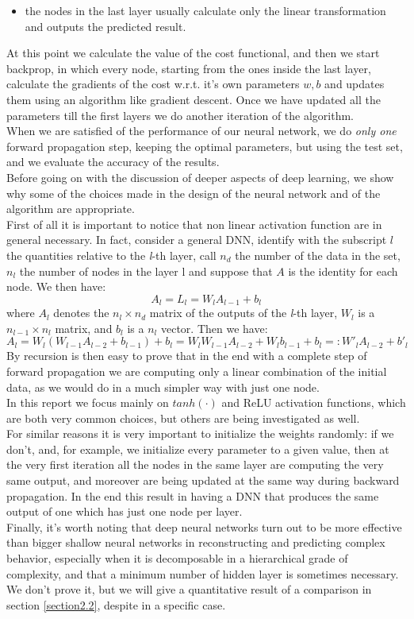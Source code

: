 \documentclass[12pt, a4paper]{report}
\theoremstyle{definition}
\begin{document}
{\begin{itemize}
\item the nodes in the last layer usually calculate only the linear transformation and outputs the predicted result.
\end{itemize}
At this point we calculate the value of the cost functional, and then we start backprop, in which every node, starting from the ones inside the last layer, calculate the gradients of the cost w.r.t. it's own parameters $w,b$ and updates them using an algorithm like gradient descent. Once we have updated all the parameters till the first layers we do another iteration of the algorithm.\\
When we are satisfied of the performance of our neural network, we do \textit{only one} forward propagation step, keeping the optimal parameters, but using the test set, and we evaluate the accuracy of the results.\\
\newline
\noindent Before going on with the discussion of deeper aspects of deep learning, we show why some of the choices made in the design of the neural network and of the algorithm are appropriate.\\
First of all it is important to notice that non linear activation function are in general necessary. In fact, consider a general DNN, identify with the subscript $l$ the quantities relative to the \textit{l}-th layer, call $n_d$ the number of the data in the set, $n_l$ the number of nodes in the layer l and suppose that $A$ is the identity for each node. We then have:
\[
A_l = L_l = W_l A_{l-1} + b_l
\]
where $A_{l}$ denotes the $n_l \times n_d$ matrix of the outputs of the \textit{l}-th layer, $W_l$ is a $n_{l-1} \times n_l $ matrix, and $b_l$ is a $n_l$ vector. Then we have:
\[
A_l=W_l(W_{l-1}A_{l-2} + b_{l-1})+ b_l = W_lW_{l-1}A_{l-2}+W_lb_{l-1}+b_l =: W'_l A_{l-2} +  b'_l
\]
By recursion is then easy to prove that in the end with a complete step of forward propagation we are computing only a linear combination of the initial data, as we would do in a much simpler way with just one node.\\
In this report we focus mainly on $tanh(\cdot)$ and ReLU activation functions, which are both very common choices, but others are being investigated as well.\\
For similar reasons it is very important to initialize the weights randomly: if we don't, and, for example, we initialize every parameter to a given value, then at the very first iteration all the nodes in the same layer are computing the very same output, and moreover are being updated at the same way during backward propagation. In the end this result in having a DNN that produces the same output of one which has just one node per layer.\\
Finally, it's worth noting that deep neural networks turn out to be more effective than bigger shallow neural networks in reconstructing and predicting complex behavior, especially when it is decomposable in a hierarchical grade of complexity, and that a minimum number of hidden layer is sometimes necessary. We don't prove it, but we will give a quantitative result of a comparison in section \ref{section2.2}, despite in a specific case.


}
\end{document}

